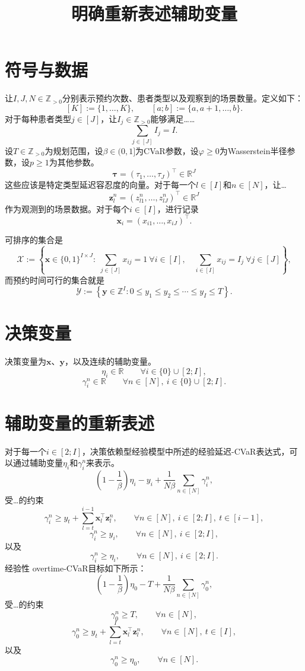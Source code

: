 \documentclass[12pt,a4paper]{article}
\title{明确重新表述辅助变量}
\author{}
\date{}
\begin{document}
\maketitle

\section*{符号与数据}
让$I,J,N\in\mathbb{Z}_{>0}$分别表示预约次数、患者类型以及观察到的场景数量。定义如下：
\[
[K]:=\{1,\ldots,K\},
\qquad
[a;b]:=\{a,a+1,\ldots,b\}.
\]
对于每种患者类型$j\in[J]$，让$I_j\in\mathbb{Z}_{>0}$能够满足……
\[
\sum_{j\in[J]} I_j=I.
\]
设$T\in\mathbb{Z}_{>0}$为规划范围，设$\beta\in(0,1]$为CVaR参数，设$\varphi\ge 0$为Wasserstein半径参数，设$p\ge 1$为其他参数。
\[
\boldsymbol{\tau}=(\tau_1,\ldots,\tau_J)^\top\in\mathbb{R}^J
\]
这些应该是特定类型延迟容忍度的向量。对于每一个$l\in[I]$和$n\in[N]$，让…
\[
\boldsymbol{z}_l^n=(z_{l1}^n,\ldots,z_{lJ}^n)^\top\in\mathbb{R}^J
\]
作为观测到的场景数据。对于每个$i\in[I]$，进行记录
\[
\boldsymbol{x}_i=(x_{i1},\ldots,x_{iJ})^\top.
\]

可排序的集合是
\[
\mathcal{X}:=\left\{
\boldsymbol{x}\in\{0,1\}^{I\times J}:\;
\sum_{j\in[J]}x_{ij}=1\ \forall i\in[I],\quad
\sum_{i\in[I]}x_{ij}=I_j\ \forall j\in[J]
\right\},
\]
而预约时间可行的集合就是
\[
\mathcal{Y}:=\left\{
\boldsymbol{y}\in\mathbb{Z}^I:
0\le y_1\le y_2\le\cdots\le y_I\le T
\right\}.
\]

\section*{决策变量}
决策变量为$\boldsymbol{x}$、$\boldsymbol{y}$，以及连续的辅助变量。
\[
\eta_i\in\mathbb{R}
\qquad \forall i\in\{0\}\cup[2;I],
\]
\[
\gamma_i^n\in\mathbb{R}
\qquad \forall n\in[N],\ i\in\{0\}\cup[2;I].
\]

\section*{辅助变量的重新表述}
对于每一个$i\in[2;I]$，决策依赖型经验模型中所述的经验延迟-CVaR表达式，可以通过辅助变量$\eta_i$和$\gamma_i^n$来表示。
\[
\left(1-\frac{1}{\beta}\right)\eta_i-y_i
+\frac{1}{N\beta}\sum_{n\in[N]}\gamma_i^n,
\]
受…的约束
\[
\gamma_i^n\ge y_t+
\sum_{l=t}^{i-1}\boldsymbol{x}_l^\top\boldsymbol{z}_l^n,
\qquad \forall n\in[N],\ i\in[2;I],\ t\in[i-1],
\]
\[
\gamma_i^n\ge y_i,
\qquad \forall n\in[N],\ i\in[2;I],
\]
以及
\[
\gamma_i^n\ge\eta_i,
\qquad \forall n\in[N],\ i\in[2;I].
\]
经验性 overtime-CVaR目标如下所示：
\[
\left(1-\frac{1}{\beta}\right)\eta_0-T
+\frac{1}{N\beta}\sum_{n\in[N]}\gamma_0^n,
\]
受…的约束
\[
\gamma_0^n\ge T,
\qquad \forall n\in[N],
\]
\[
\gamma_0^n\ge y_t+
\sum_{l=t}^{I}\boldsymbol{x}_l^\top\boldsymbol{z}_l^n,
\qquad \forall n\in[N],\ t\in[I],
\]
以及
\[
\gamma_0^n\ge\eta_0,
\qquad \forall n\in[N].
\]
\end{document}
